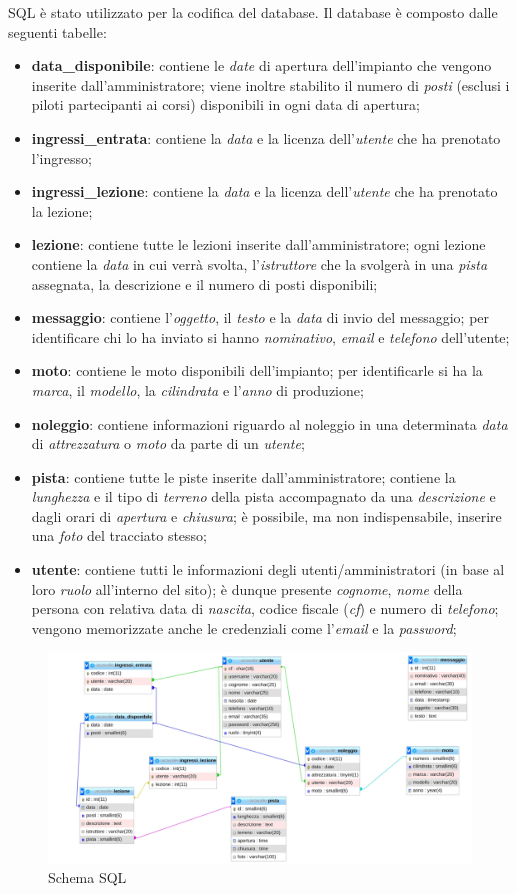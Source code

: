 SQL è stato utilizzato per la codifica del database. Il database è composto dalle seguenti tabelle:
\begin{itemize}
    \item \textbf{data\_disponibile}: contiene le \textit{date} di apertura dell'impianto che vengono
    inserite dall'amministratore; viene inoltre stabilito il numero di \textit{posti} (esclusi i piloti
    partecipanti ai corsi) disponibili in ogni data di apertura;
    \item \textbf{ingressi\_entrata}: contiene la \textit{data} e la licenza dell'\textit{utente} che ha prenotato l'ingresso;
    \item \textbf{ingressi\_lezione}: contiene la \textit{data} e la licenza dell'\textit{utente} che ha prenotato la lezione;
    \item \textbf{lezione}: contiene tutte le lezioni inserite dall'amministratore; ogni lezione contiene la \textit{data}
    in cui verrà svolta, l'\textit{istruttore} che la svolgerà in una \textit{pista} assegnata, la descrizione e il numero di posti disponibili;
    \item \textbf{messaggio}: contiene l'\textit{oggetto}, il \textit{testo} e la \textit{data} di invio del messaggio; per identificare
    chi lo ha inviato si hanno \textit{nominativo}, \textit{email} e \textit{telefono} dell'utente;
    \item \textbf{moto}: contiene le moto disponibili dell'impianto; per identificarle si ha la \textit{marca}, il \textit{modello},
    la \textit{cilindrata} e l'\textit{anno} di produzione;
    \item \textbf{noleggio}: contiene informazioni riguardo al noleggio in una determinata \textit{data} di \textit{attrezzatura} o
    \textit{moto} da parte di un \textit{utente};
    \item \textbf{pista}: contiene tutte le piste inserite dall'amministratore; contiene la \textit{lunghezza} e il tipo di \textit{terreno}
    della pista accompagnato da una \textit{descrizione} e dagli orari di \textit{apertura} e \textit{chiusura}; è possibile,
    ma non indispensabile, inserire una \textit{foto} del tracciato stesso;
    \item \textbf{utente}: contiene tutti le informazioni degli utenti/amministratori (in base al loro \textit{ruolo} all'interno del sito);
    è dunque presente \textit{cognome}, \textit{nome} della persona con relativa data di \textit{nascita}, codice fiscale (\textit{cf}) e
    numero di \textit{telefono}; vengono memorizzate anche le credenziali come l'\textit{email} e la \textit{password};
\end{itemize}
\begin{figure}[H]
    \includegraphics[scale=0.4]{./res/schemaSQL.pdf}
    \centering
    \caption{Schema SQL}
\end{figure}
